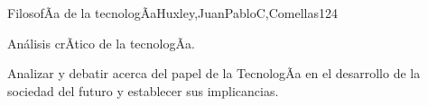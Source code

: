 \begin{syllabus}
\begin{unit}{FilosofÃ­a de la tecnologÃ­a}{Huxley,JuanPabloC,Comellas}{12}{4}
\begin{topics}
      \item {Análisis crÃ­tico de la tecnologÃ­a.}
\end{topics}
\begin{unitgoals}
	\item Analizar  y debatir acerca del papel de la TecnologÃ­a en el desarrollo de la sociedad del futuro y establecer  sus implicancias. 
\end{unitgoals}
\end{unit}



\begin{coursebibliography}
\end{coursebibliography}

\end{syllabus}

%
